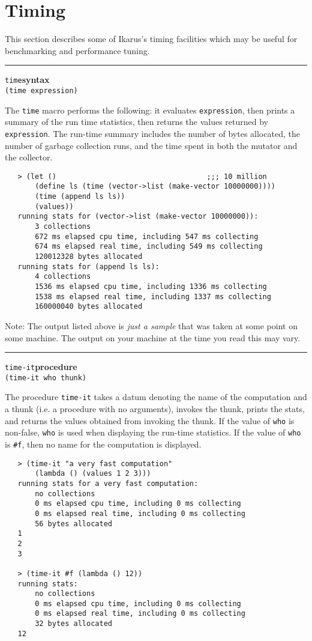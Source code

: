 \documentclass[onecolumn, 12pt, twoside, openright, dvipdfm]{book}
\makeatletter
\newcommand{\idxlabeldefun}[5]{
\vspace{1ex}
\rule{\textwidth}{2pt}
{\phantomsection\index{#1@\texttt{#2}}\label{#3}{\Large\texttt{#4}}\hfill\textbf{#5}}\\}
\newcommand{\idxdefun}[3]{\idxlabeldefun{#1}{#2}{#1}{#2}{#3}}
\newcommand{\defun}[2]{\idxdefun{#1}{#1}{#2}}
\makeatother
\begin{document}
\newpage
\section{Timing}

This section describes some of Ikarus's timing facilities which may
be useful for benchmarking and performance tuning.

\defun{time}{syntax}
\texttt{(time expression)}

The \texttt{time} macro performs the following:  it evaluates
\texttt{expression}, then prints a summary of the run time
statistics, then returns the values returned by \texttt{expression}.
The run-time summary includes the number of bytes allocated, the
number of garbage collection runs, and the time spent in both the
mutator and the collector.


\begin{verbatim}
   > (let ()                                   ;;; 10 million
       (define ls (time (vector->list (make-vector 10000000))))
       (time (append ls ls))
       (values))
   running stats for (vector->list (make-vector 10000000)):
       3 collections
       672 ms elapsed cpu time, including 547 ms collecting
       674 ms elapsed real time, including 549 ms collecting
       120012328 bytes allocated
   running stats for (append ls ls):
       4 collections
       1536 ms elapsed cpu time, including 1336 ms collecting
       1538 ms elapsed real time, including 1337 ms collecting
       160000040 bytes allocated
\end{verbatim}

Note: The  output listed above is \emph{just a sample} that was
taken at some point on some machine.  The output on your
machine at the time you read this may vary.

\newpage
\defun{time-it}{procedure}
\texttt{(time-it who thunk)}

The procedure \texttt{time-it} takes a datum denoting the name of
the computation and a thunk (i.e. a
procedure with no arguments), invokes the thunk, prints the stats,
and returns the values obtained from invoking the thunk.  
If the value of \texttt{who} is non-false, \texttt{who}
is used when displaying the run-time statistics.  If the value of
\texttt{who} is \texttt{\#f}, then no name for the computation is
displayed.

\begin{verbatim}
   > (time-it "a very fast computation"
       (lambda () (values 1 2 3)))
   running stats for a very fast computation:
       no collections
       0 ms elapsed cpu time, including 0 ms collecting
       0 ms elapsed real time, including 0 ms collecting
       56 bytes allocated
   1
   2
   3

   > (time-it #f (lambda () 12))
   running stats:
       no collections
       0 ms elapsed cpu time, including 0 ms collecting
       0 ms elapsed real time, including 0 ms collecting
       32 bytes allocated
   12
\end{verbatim}
\end{document}
